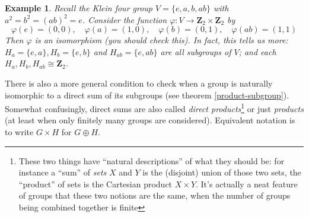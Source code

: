 \documentclass[12pt]{article}
\numberwithin{equation}{subsection}
\theoremstyle{note}
\newtheorem{example}[subsection]{Example}
\begin{document}
\begin{example}\label{klein-four-group}
	Recall the Klein four group $V=\{e,a,b,ab\}$ with $a^2=b^2=(ab)^2=e$. Consider the function $\varphi \colon V\to \mathbf{Z}_2\times \mathbf{Z}_2$ by \[ \varphi(e)=(0,0), \quad \varphi(a)=(1,0), \quad \varphi(b)=(0,1), \quad \varphi(ab)=(1,1)\]
	Then $\varphi$ is an isomorphism (you should check this). In fact, this tells us more: $H_a=\{e,a\},H_b= \{e,b\}$ and $H_{ab}=\{e,ab\}$ are all subgroups of $V$; and each $H_a, H_b, H_{ab} \cong \mathbf{Z}_2$. 
\end{example}
There is also a more general condition to check when a group is naturally isomorphic to a direct sum of its subgroups (see theorem \ref{product-subgroup}). Somewhat confusingly, direct sums are also called \textit{direct products}\footnote{These two things have ``natural descriptions'' of what they should be: for instance a ``sum'' of \textit{sets} $X$ and $Y$ is the (disjoint) union of those two sets, the ``product'' of sets is the Cartesian product $X\times Y$. It's actually a neat feature of groups that these two notions are the same, when the number of groups being combined together is finite} or just \textit{products} (at least when only finitely many groups are considered). Equivalent notation is to write $G\times H$ for $G\oplus H$. 
\end{document}
